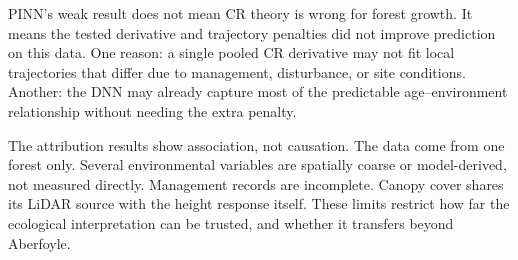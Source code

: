 PINN's weak result does not mean CR theory is wrong for forest growth. It means the tested
derivative and trajectory penalties did not improve prediction on this data. One reason: a single
pooled CR derivative may not fit local trajectories that differ due to management, disturbance, or
site conditions. Another: the DNN may already capture most of the predictable age--environment
relationship without needing the extra penalty.

The attribution results show association, not causation. The data come from one forest only.
Several environmental variables are spatially coarse or model-derived, not measured directly.
Management records are incomplete. Canopy cover shares its LiDAR source with the height response
itself. These limits restrict how far the ecological interpretation can be trusted, and whether it
transfers beyond Aberfoyle.


